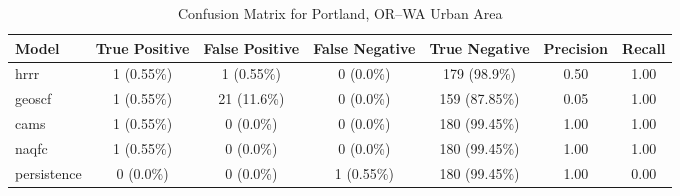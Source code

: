 \begin{table}[h!]
\centering
\begin{tabular}{lcccccc}
\hline
Model & True Positive & False Positive & False Negative & True Negative & Precision & Recall\\ \hline
hrrr & 1 (0.55\%) & 1 (0.55\%) & 0 (0.0\%) & 179 (98.9\%) & \cellcolor{red!25}0.50 & \cellcolor{green!25}1.00 \\ 
geoscf & 1 (0.55\%) & 21 (11.6\%) & 0 (0.0\%) & 159 (87.85\%) & \cellcolor{red!25}0.05 & \cellcolor{green!25}1.00 \\ 
cams & 1 (0.55\%) & 0 (0.0\%) & 0 (0.0\%) & 180 (99.45\%) & \cellcolor{green!25}1.00 & \cellcolor{green!25}1.00 \\ 
naqfc & 1 (0.55\%) & 0 (0.0\%) & 0 (0.0\%) & 180 (99.45\%) & \cellcolor{green!25}1.00 & \cellcolor{green!25}1.00 \\ 
persistence & 0 (0.0\%) & 0 (0.0\%) & 1 (0.55\%) & 180 (99.45\%) & 1.00 & 0.00 \\ 
\hline
\end{tabular}
\caption{Confusion Matrix for Portland, OR--WA Urban Area}
\end{table}
